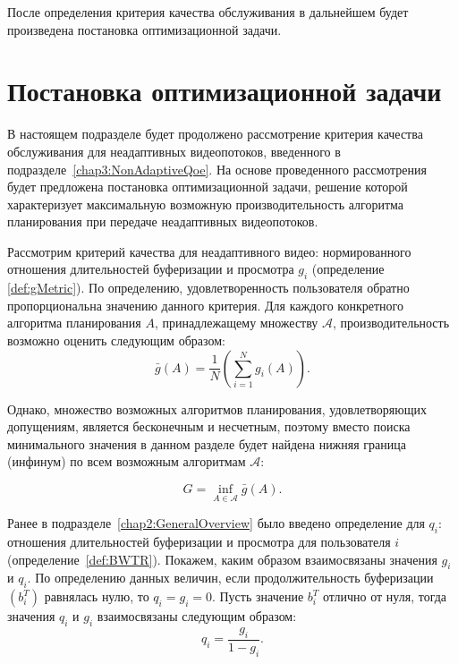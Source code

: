 После определения критерия качества обслуживания в дальнейшем будет произведена постановка оптимизационной задачи.

\section{Постановка оптимизационной задачи}
\label{chap3:NonAdaptiveOptimizationProblem}

В настоящем подразделе будет продолжено рассмотрение критерия качества обслуживания для неадаптивных видеопотоков, введенного в подразделе~\ref{chap3:NonAdaptiveQoe}. На основе проведенного рассмотрения будет предложена постановка оптимизационной задачи, решение которой характеризует максимальную возможную производительность алгоритма планирования при передаче неадаптивных видеопотоков.

Рассмотрим критерий качества для неадаптивного видео: нормированного отношения длительностей буферизации и просмотра $g_i$ (определение \ref{def:gMetric}). По определению, удовлетворенность пользователя обратно пропорциональна значению данного критерия. Для каждого конкретного алгоритма планирования $A$, принадлежащему множеству $\mathcal{A}$, производительность возможно оценить следующим образом:
$$\bar{g}\left(A\right) = \frac{1}{N}\left(\sum\limits_{i=1}^{N} {g_i\left(A\right)}\right).$$

Однако, множество возможных алгоритмов планирования, удовлетворяющих допущениям, является бесконечным и несчетным, поэтому вместо поиска минимального значения в данном разделе будет найдена нижняя граница (инфинум) по всем возможным алгоритмам $\mathcal{A}$:

\begin{equation}
	\label{eq:gMetricGoal}
	G = \inf\limits_{A \in \mathcal{A}} \bar{g}\left(A\right).
\end{equation}

Ранее в подразделе~\ref{chap2:GeneralOverview} было введено определение для $q_i$: отношения длительностей буферизации и просмотра для пользователя $i$ (определение~\ref{def:BWTR}). Покажем, каким образом взаимосвязаны значения $g_i$ и $q_i$. По определению данных величин, если продолжительность буферизации $\left(b_i^T\right)$ равнялась нулю, то $q_i=g_i=0$. Пусть значение $b_i^T$ отлично от нуля, тогда значения $q_i$ и $g_i$ взаимосвязаны следующим образом:
$$q_i = \frac{g_i}{1-g_i}.$$

